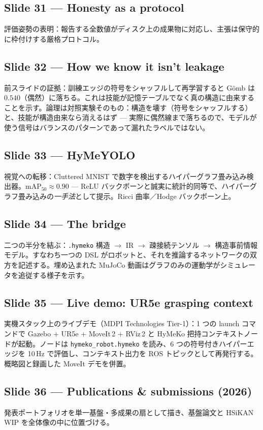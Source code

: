 \documentclass[10pt]{article}
\begin{document}
\subsection*{Slide 31 --- Honesty as a protocol}
評価姿勢の表明：報告する全数値がディスク上の成果物に対応し、主張は保守的に枠付けする厳格プロトコル。

\subsection*{Slide 32 --- How we know it isn't leakage}
前スライドの証拠：訓練エッジの符号をシャッフルして再学習すると G\"omb は $0.540$（偶然）に落ちる。これは技能が記憶テーブルでなく真の構造に由来することを示す。論理は対照実験そのもの：構造を壊す（符号をシャッフルする）と、技能が構造由来なら消えるはず --- 実際に偶然線まで落ちるので、モデルが使う信号はバランスのパターンであって漏れたラベルではない。

\subsection*{Slide 33 --- HyMeYOLO}
視覚への転移：Cluttered MNIST で数字を検出するハイパーグラフ畳み込み検出器。mAP$_{50}\approx0.90$ --- ReLU バックボーンと誠実に統計的同等で、ハイパーグラフ畳み込みの\emph{一手法}として提示。Ricci 曲率／Hodge バックボーン上。

\subsection*{Slide 34 --- The bridge}
二つの半分を結ぶ：\texttt{.hymeko} 構造 $\to$ IR $\to$ 疎接続テンソル $\to$ 構造事前情報モデル。すなわち一つの DSL がロボットと、それを推論するネットワークの双方を記述する。埋め込まれた MuJoCo 動画はグラフのみの運動学がシミュレータを追従する様子を示す。

\subsection*{Slide 35 --- Live demo: UR5e grasping context}
実機スタック上のライブデモ（MDPI Technologies Tier-1）：1 つの launch コマンドで Gazebo + UR5e + MoveIt\,2 + RViz\,2 と HyMeKo 把持コンテキストノードが起動。ノードは \texttt{hymeko\_robot.hymeko} を読み、6 つの符号付きハイパーエッジを 10\,Hz で評価し、コンテキスト出力を ROS トピックとして再発行する。概略図と録画した MoveIt デモを併置。

\subsection*{Slide 36 --- Publications \& submissions (2026)}
発表ポートフォリオを単一基盤・多成果の扇として描き、基盤論文と HSiKAN WIP を全体像の中に位置づける。
\end{document}
